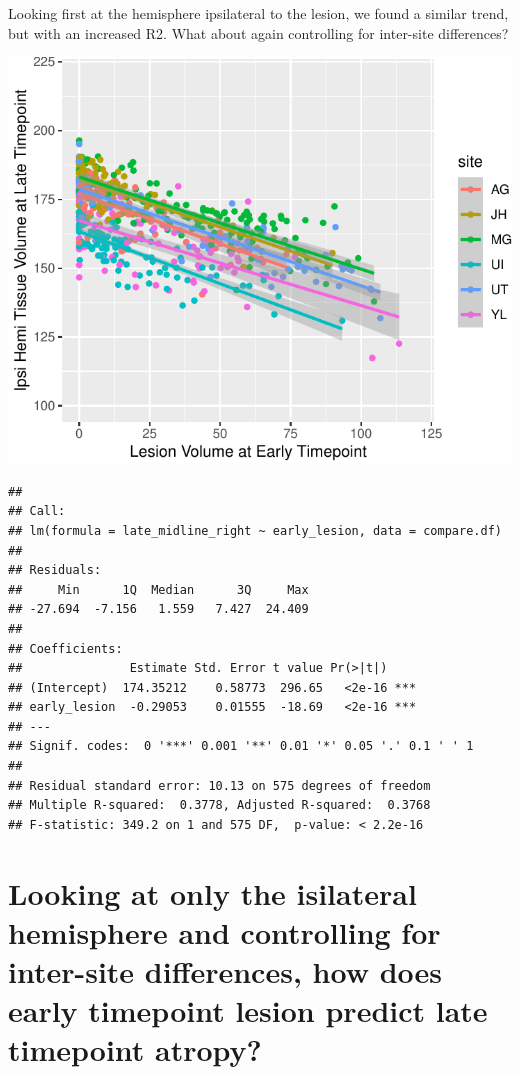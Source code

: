 \documentclass[
]{article}
\begin{document}
Looking first at the hemisphere ipsilateral to the lesion, we found a
similar trend, but with an increased R2. What about again controlling
for inter-site differences?

\begin{center}\includegraphics{paper_files/figure-latex/plot_raw_ipsi-1} \end{center}

\begin{verbatim}
## 
## Call:
## lm(formula = late_midline_right ~ early_lesion, data = compare.df)
## 
## Residuals:
##     Min      1Q  Median      3Q     Max 
## -27.694  -7.156   1.559   7.427  24.409 
## 
## Coefficients:
##               Estimate Std. Error t value Pr(>|t|)    
## (Intercept)  174.35212    0.58773  296.65   <2e-16 ***
## early_lesion  -0.29053    0.01555  -18.69   <2e-16 ***
## ---
## Signif. codes:  0 '***' 0.001 '**' 0.01 '*' 0.05 '.' 0.1 ' ' 1
## 
## Residual standard error: 10.13 on 575 degrees of freedom
## Multiple R-squared:  0.3778, Adjusted R-squared:  0.3768 
## F-statistic: 349.2 on 1 and 575 DF,  p-value: < 2.2e-16
\end{verbatim}

\hypertarget{looking-at-only-the-isilateral-hemisphere-and-controlling-for-inter-site-differences-how-does-early-timepoint-lesion-predict-late-timepoint-atropy}{%
\section{Looking at only the isilateral hemisphere and controlling for
inter-site differences, how does early timepoint lesion predict late
timepoint
atropy?}\label{looking-at-only-the-isilateral-hemisphere-and-controlling-for-inter-site-differences-how-does-early-timepoint-lesion-predict-late-timepoint-atropy}}
\end{document}
